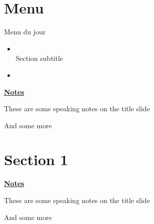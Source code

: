\documentclass[cabin]{beamer}
\begin{document}
\section{Menu} 
\begin{frame}{Menu du jour}\label{menu}
\begin{itemize}
\item \hyperlink{section}{}\\\smallskip
			 {\small Section subtitle}\medskip
			 
\item \hyperlink{appendix}{}\\\smallskip
\end{itemize}
\end{frame}
\begin{flushleft}
    \underline{\textbf{Notes}}\setlength{\parskip}{.15cm}\notesize\newline\par
    These are some speaking notes on the title slide \par
    And some more 
\end{flushleft}

\section{Section 1}
\begin{frame}[plain]\label{section}
\end{frame}
\begin{flushleft}
    \underline{\textbf{Notes}}\setlength{\parskip}{.15cm}\notesize\newline\par
    These are some speaking notes on the title slide \par
    And some more 
\end{flushleft}
\end{document}
